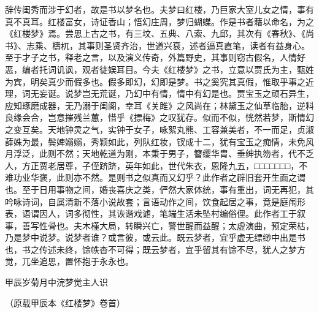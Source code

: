 {}

辞传闺秀而涉于幻者，故是书以梦名也。夫梦曰红楼，乃巨家大室儿女之情，事有真不真耳。红楼富女，诗证香山；悟幻庄周，梦归蝴蝶。作是书者藉以命名，为之《红楼梦》焉。尝思上古之书，有三坟、五典、八索、九邱，其次有《春秋》、《尚书》、志乘、檮杌，其事则圣贤齐治，世道兴衰，述者逼真直笔，读者有益身心。至于才子之书，释老之言，以及演义传奇，外篇野史，其事则窃古假名，人情好恶，编者托词讥讽，观者徒娱耳目。今夫《红楼梦》之书，立意以贾氏为主，甄姓为宾，明矣真少而假多也。假多即幻，幻即是梦。书之奚究其真假，惟取乎事之近理，词无妄诞。说梦岂无荒诞，乃幻中有情，情中有幻是也。贾宝玉之顽石异生，应知琢磨成器，无乃溺于闺阁，幸耳《关雎》之风尚在；林黛玉之仙草临胎，逆料良缘会合，岂意摧残兰蕙，惜乎《摽梅》之叹犹存。似而不似，恍然若梦，斯情幻之变互矣。天地钟灵之气，实钟于女子，咏絮丸熊、工容兼美者，不一而足，贞淑薛姝为最，鬓婢嫋嫋，秀颖如此，列队红妆，钗成十二，犹有宝玉之痴情，未免风月浮泛，此则不然；天地乾道为刚，本秉于男子，簪缨华胄、垂绅执笏者，代不乏人，方正贾老居尊，子侄跻跻，英年如此，世代朱衣，恩隆九五，□□□□□□□，不难功业华褒，此则亦不然。是则书之似真而又幻乎？此作者之辟旧套开生面之谓也。至于日用事物之间，婚丧喜庆之类，俨然大家体统，事有重出，词无再犯，其吟咏诗词，自属清新不落小说故套；言语动作之间，饮食起居之事，竟是庭闱形表，语谓因人，词多彻性，其诙谐戏谑，笔端生活未坠村编俗俚。此作者工于叙事，善写性骨也。夫木槿大局，转瞬兴亡，警世醒而益醒；太虚演曲，预定荣枯，乃是梦中说梦。说梦者谁？或言彼，或云此。既云梦者，宜乎虚无缥缈中出是书也，书之传述未终，馀帙杳不可得；既云梦者，宜乎留其有馀不尽，犹人之梦方觉，兀坐追思，置怀抱于永永也。

\begin{flushright}
	甲辰岁菊月中浣梦觉主人识　　

{（原载甲辰本《红楼梦》卷首）}　　
\end{flushright}
